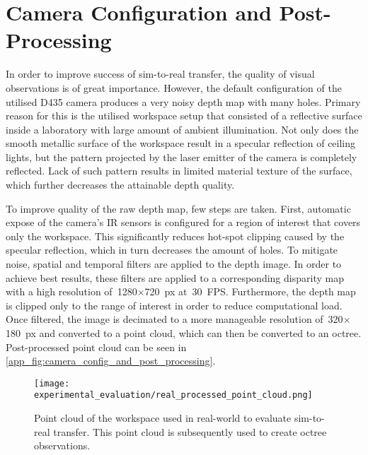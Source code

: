 \section{Camera Configuration and Post-Processing}\label{app:camera_configuration_and_postprocessing}

In order to improve success of sim-to-real transfer, the quality of visual observations is of great importance. However, the default configuration of the utilised D435 camera produces a very noisy depth map with many holes. Primary reason for this is the utilised workspace setup that consisted of a reflective surface inside a laboratory with large amount of ambient illumination. Not only does the smooth metallic surface of the workspace result in a specular reflection of ceiling lights, but the pattern projected by the laser emitter of the camera is completely reflected. Lack of such pattern results in limited material texture of the surface, which further decreases the attainable depth quality.

To improve quality of the raw depth map, few steps are taken. First, automatic expose of the camera's IR sensors is configured for a region of interest that covers only the workspace. This significantly reduces hot-spot clipping caused by the specular reflection, which in turn decreases the amount of holes. To mitigate noise, spatial and temporal filters are applied to the depth image. In order to achieve best results, these filters are applied to a corresponding disparity map with a high resolution of~1280\(\times\)720~px at~30~FPS. Furthermore, the depth map is clipped only to the range of interest in order to reduce computational load. Once filtered, the image is decimated to a more manageable resolution of~320\(\times\)180~px and converted to a point cloud, which can then be converted to an octree. Post-processed point cloud can be seen in \autoref{app_fig:camera_config_and_post_processing}.

\setcounter{figure}{0}
\begin{figure}[ht]
    \centering
    \texttt{[image: experimental\_evaluation/real\_processed\_point\_cloud.png]}
    \caption{Point cloud of the workspace used in real-world to evaluate sim-to-real transfer. This point cloud is subsequently used to create octree observations.}
    \label{app_fig:camera_config_and_post_processing}
\end{figure}
